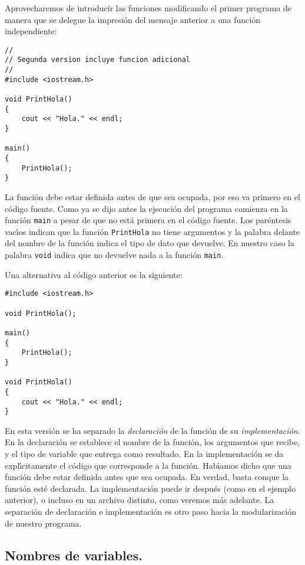 Aprovecharemos de
introducir las funciones
 modificando el primer programa de manera que se delegue
la impresi{\'o}n del mensaje anterior a una funci{\'o}n independiente:

\begin{verbatim}
//
// Segunda version incluye funcion adicional
//
#include <iostream.h>

void PrintHola()
{
    cout << "Hola." << endl;
}       

main()
{
    PrintHola();   
}
\end{verbatim}

La funci{\'o}n debe estar definida antes de que sea ocupada, por eso va
primero en el c{\'o}digo fuente. Como ya se dijo antes la ejecuci{\'o}n del
programa comienza en la funci{\'o}n \verb+main+ a pesar de que no est{\'a}
primera en el c{\'o}digo fuente. Los par{\'e}ntesis vac{\'\i}os indican que la
funci{\'o}n \verb+PrintHola+ no tiene argumentos y la palabra delante del nombre de la
funci{\'o}n indica el tipo de dato que devuelve. En nuestro caso la
palabra \verb+void+ indica que no devuelve nada a la funci{\'o}n
\verb+main+. 

Una alternativa al c\'odigo anterior es la siguiente:
\begin{verbatim}
#include <iostream.h>

void PrintHola();

main()
{
    PrintHola();   
}

void PrintHola()
{
    cout << "Hola." << endl;
}       
\end{verbatim}

En esta versi\'on se ha separado la {\em declaraci\'on\/} de la
funci\'on de su {\em implementaci\'on}. En la declaraci\'on se
establece el nombre de la funci\'on, los argumentos que recibe, y el
tipo de variable que entrega como resultado. En la implementaci\'on se
da expl\'{\i}citamente el c\'odigo que corresponde a la
funci\'on. Hab\'{\i}amos dicho que una funci\'on debe estar definida
antes que sea ocupada. En verdad, basta conque la funci\'on est\'e
declarada. La implementaci\'on puede ir despu\'es (como en el ejemplo
anterior), o incluso en un archivo distinto, como veremos m\'as
adelante. La separaci\'on de declaraci\'on e implementaci\'on es otro
paso hacia la modularizaci\'on de nuestro programa.



\subsection{Nombres de variables.}

